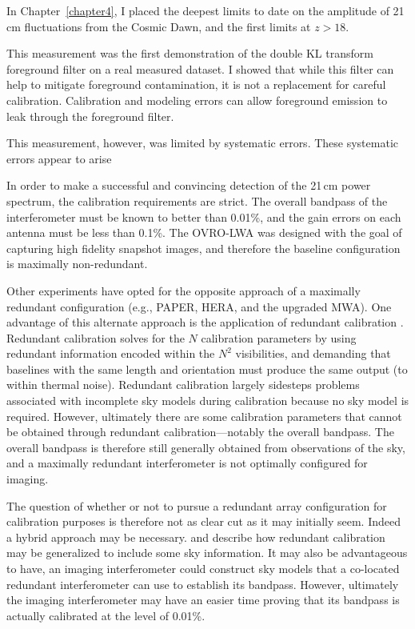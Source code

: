 \begin{bibunit}
In Chapter~\ref{chapter4}, I placed the deepest limits to date on the amplitude of 21\,cm
fluctuations from the Cosmic Dawn, and the first limits at $z > 18$.

This measurement was the first demonstration of the double KL transform foreground filter on a real
measured dataset. I showed that while this filter can help to mitigate foreground contamination, it
is not a replacement for careful calibration. Calibration and modeling errors can allow foreground
emission to leak through the foreground filter.

This measurement, however, was limited by systematic errors. These systematic errors appear to arise

In order to make a successful and convincing detection of the 21\,cm power spectrum, the calibration
requirements are strict. The overall bandpass of the interferometer must be known to better than
0.01\%, and the gain errors on each antenna must be less than 0.1\%. The OVRO-LWA was designed with
the goal of capturing high fidelity snapshot images, and therefore the baseline configuration is
maximally non-redundant.

Other experiments have opted for the opposite approach of a maximally redundant configuration (e.g.,
PAPER, HERA, and the upgraded MWA). One advantage of this alternate approach is the application of
redundant calibration \citep{2010MNRAS.408.1029L}. Redundant calibration solves for the $N$
calibration parameters by using redundant information encoded within the $N^2$ visibilities, and
demanding that baselines with the same length and orientation must produce the same output (to
within thermal noise). Redundant calibration largely sidesteps problems associated with incomplete
sky models during calibration because no sky model is required. However, ultimately there are some
calibration parameters that cannot be obtained through redundant calibration---notably the overall
bandpass. The overall bandpass is therefore still generally obtained from observations of the sky,
and a maximally redundant interferometer is not optimally configured for imaging.

The question of whether or not to pursue a redundant array configuration for calibration purposes is
therefore not as clear cut as it may initially seem.  Indeed a hybrid approach may be necessary.
\citet{2010MNRAS.408.1029L} and \citet{2017arXiv170101860S} describe how redundant calibration may
be generalized to include some sky information.  It may also be advantageous to have, an imaging
interferometer could construct sky models that a co-located redundant interferometer can use to
establish its bandpass. However, ultimately the imaging interferometer may have an easier time
proving that its bandpass is actually calibrated at the level of 0.01\%.


\end{bibunit}
